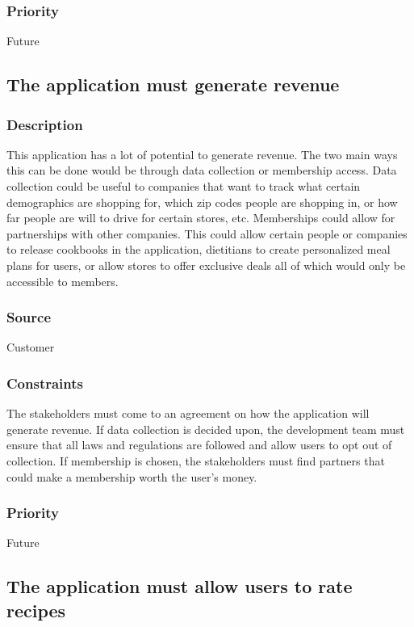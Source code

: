 \subsubsection{Priority}
Future

\subsection{The application must generate revenue}
\subsubsection{Description}
This application has a lot of potential to generate revenue. The two main ways this can be done would be through data collection or membership access. Data collection could be useful to companies that want to track what certain demographics are shopping for, which zip codes people are shopping in, or how far people are will to drive for certain stores, etc. Memberships could allow for partnerships with other companies. This could allow certain people or companies to release cookbooks in the application, dietitians to create personalized meal plans for users, or allow stores to offer exclusive deals all of which would only be accessible to members.
\subsubsection{Source}
Customer
\subsubsection{Constraints}
The stakeholders must come to an agreement on how the application will generate revenue. If data collection is decided upon, the development team must ensure that all laws and regulations are followed and allow users to opt out of collection. If membership is chosen, the stakeholders must find partners that could make a membership worth the user's money.
\subsubsection{Priority}
Future

\subsection{The application must allow users to rate recipes}
